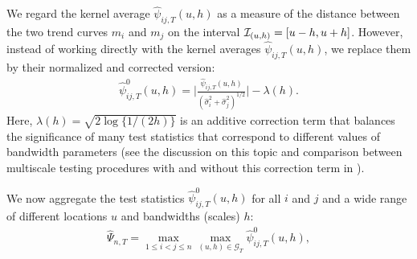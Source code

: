 \documentclass[a4paper,12pt]{article}
\begin{document}
We regard the kernel average $\widehat{\psi}_{ij,T}(u,h)$ as a measure of the distance between the two trend curves $m_i$ and $m_j$ on the interval $\mathcal{I}_{(u, h)} = [u-h,u+h]$. However, instead of working directly with the kernel averages $\widehat{\psi}_{ij,T}(u,h)$, we replace them by their normalized and corrected version:
\begin{align}\label{eq:psi_zero_ij}
\hat{\psi}^0_{ij,T}(u, h) =  \Big|\frac{\widehat{\psi}_{ij,T}(u,h)}{(\widehat{\sigma}_i^2 + \widehat{\sigma}_j^2)^{1/2}}\Big| - \lambda(h).
\end{align}
Here, $\lambda(h) = \sqrt{2 \log \{ 1/(2h) \}}$ is an additive correction term that balances the significance of many test statistics that correspond to different values of bandwidth parameters (see the discussion on this topic and comparison between multiscale testing procedures with and without this correction term in \citet{KhismatullinaVogt2020}).

We now aggregate the test statistics $\hat{\psi}^0_{ij, T}(u,h)$ for all $i$ and $j$ and a wide range of different locations $u$ and bandwidths (scales) $h$:
\begin{align}\label{eq:Psi_hat}
	\widehat{\Psi}_{n,T} = \max_{1 \le i < j \le n}\max_{(u,h) \in \mathcal{G}_T} \hat{\psi}^0_{ij,T}(u, h),
\end{align}
\end{document}
